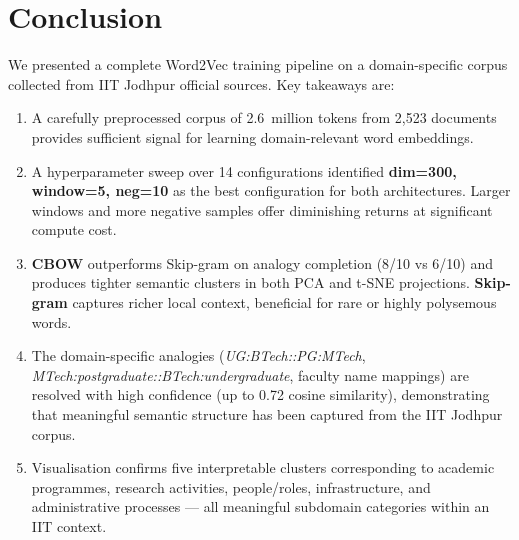 \documentclass[12pt,a4paper]{article}
\begin{document}
\newpage

\section*{Conclusion}

We presented a complete Word2Vec training pipeline on a domain-specific corpus
collected from IIT Jodhpur official sources. Key takeaways are:

\begin{enumerate}[leftmargin=1.4em]
    \item A carefully preprocessed corpus of 2.6~million tokens from 2,523
          documents provides sufficient signal for learning domain-relevant
          word embeddings.

    \item A hyperparameter sweep over 14 configurations identified
          \textbf{dim=300, window=5, neg=10} as the best configuration for
          both architectures. Larger windows and more negative samples offer
          diminishing returns at significant compute cost.

    \item \textbf{CBOW} outperforms Skip-gram on analogy completion (8/10 vs
          6/10) and produces tighter semantic clusters in both PCA and t-SNE
          projections. \textbf{Skip-gram} captures richer local context,
          beneficial for rare or highly polysemous words.

    \item The domain-specific analogies (\textit{UG:BTech::PG:MTech},
          \textit{MTech:postgraduate::BTech:undergraduate}, faculty name
          mappings) are resolved with high confidence (up to 0.72 cosine
          similarity), demonstrating that meaningful semantic structure has
          been captured from the IIT Jodhpur corpus.

    \item Visualisation confirms five interpretable clusters corresponding to
          academic programmes, research activities, people/roles,
          infrastructure, and administrative processes --- all meaningful
          subdomain categories within an IIT context.
\end{enumerate}
\end{document}

